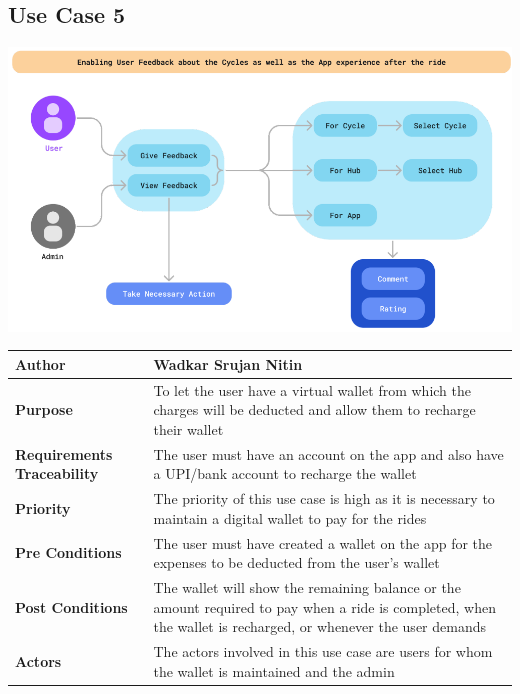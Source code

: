 \documentclass{scrreprt}
\begin{document}
\subsection{Use Case 5}
\begin{center}
\includegraphics*[scale=0.6]{usecase-5.png}\\
\vspace{5mm}
\begin{tabular}{|l|p{10cm}|}
    \hline
    \textbf{Author} &  Wadkar Srujan Nitin\\
    \hline
    \textbf{Purpose} & To let the user have a virtual wallet from which the charges will be deducted and allow them to recharge their wallet \\
    \hline
    \textbf{Requirements Traceability} & The user must have an account on the app and also have a UPI/bank account to recharge the wallet\\
    \hline
    \textbf{Priority} & The priority of this use case is high as it is necessary to maintain a digital wallet to pay for the rides\\
    \hline
    \textbf{Pre Conditions} & The user must have created a wallet on the app for the expenses to be deducted from the user’s wallet\\
    \hline
    \textbf{Post Conditions} & The wallet will show the remaining balance or the amount required to pay when a ride is completed, when the wallet is recharged, or whenever the user demands\\
    \hline
    \textbf{Actors} & The actors involved in this use case are users for whom the wallet is maintained and the admin\\
    \hline
\end{tabular}
\end{center}
\end{document}
